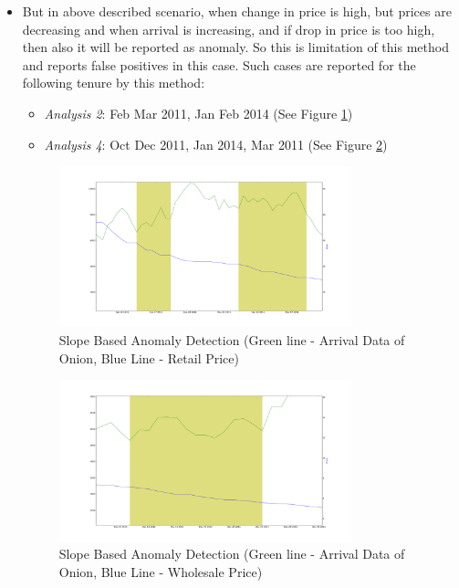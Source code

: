 \documentclass[a4paper,10pt]{report}
\begin{document}
\begin{itemize}
			\item But in above described scenario, when change in price is high, but prices are decreasing and when arrival is increasing, and if drop in price is too high, then also it will be reported as anomaly.	So this is limitation of this method and reports false positives in this case.
			Such cases are reported for the following tenure by this method:
			
			\begin{itemize}
				\item \textit{Analysis 2}: Feb Mar 2011, Jan Feb 2014 (See Figure \ref{fig:12122})
				\item \textit{Analysis 4}: Oct Dec 2011, Jan 2014, Mar 2011 (See Figure \ref{fig:12142})
			\end{itemize}
			
			\begin{figure}[H]
		    	\centering
  		    	\includegraphics[width=0.8\textwidth]{graphs/12122.png}
		    	\caption{Slope Based Anomaly Detection (Green line - Arrival Data of Onion, Blue Line - Retail Price)}
		    	\label{fig:12122}
			\end{figure}
			
			\begin{figure}[H]
		    	\centering
  		    	\includegraphics[width=0.8\textwidth]{graphs/12142.png}
		    	\caption{Slope Based Anomaly Detection (Green line - Arrival Data of Onion, Blue Line - Wholesale Price)}
		    	\label{fig:12142}
			\end{figure}
			

\end{itemize}
\end{document}
